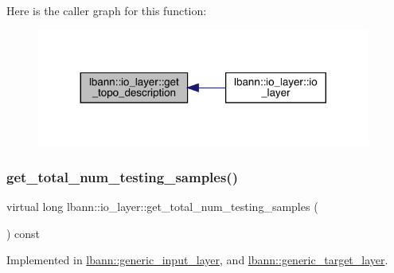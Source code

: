 Here is the caller graph for this function\+:\nopagebreak
\begin{figure}[H]
\begin{center}
\leavevmode
\includegraphics[width=311pt]{classlbann_1_1io__layer_a955ab7100591d07d0758e8f95c6e50be_icgraph}
\end{center}
\end{figure}
\mbox{\label{classlbann_1_1io__layer_a8c1575ad108ffbdf2a553a44509211e6}} 
\subsubsection{\texorpdfstring{get\+\_\+total\+\_\+num\+\_\+testing\+\_\+samples()}{get\_total\_num\_testing\_samples()}}
{\footnotesize\ttfamily virtual long lbann\+::io\+\_\+layer\+::get\+\_\+total\+\_\+num\+\_\+testing\+\_\+samples (\begin{DoxyParamCaption}{ }\end{DoxyParamCaption}) const\hspace{0.3cm}{\ttfamily [pure virtual]}}



Implemented in \hyperlink{classlbann_1_1generic__input__layer_ab5b5318cf000fbdaf35a3545335b60b2}{lbann\+::generic\+\_\+input\+\_\+layer}, and \hyperlink{classlbann_1_1generic__target__layer_af41c92981e0a1731d3dee9b1b49201db}{lbann\+::generic\+\_\+target\+\_\+layer}.

